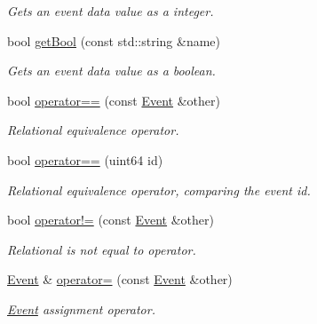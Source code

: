 \begin{DoxyCompactItemize}
\begin{DoxyCompactList}\small\item\em Gets an event data value as a integer. \end{DoxyCompactList}\item 
\mbox{\label{class_arcana_1_1_event_a7f32306719cdc73d3e2a8f4751bc6bb6}} 
bool \mbox{\hyperlink{class_arcana_1_1_event_a7f32306719cdc73d3e2a8f4751bc6bb6}{get\+Bool}} (const std\+::string \&name)
\begin{DoxyCompactList}\small\item\em Gets an event data value as a boolean. \end{DoxyCompactList}\item 
\mbox{\label{class_arcana_1_1_event_ab1238d3e13e2ce43528ab2dff03affb4}} 
bool \mbox{\hyperlink{class_arcana_1_1_event_ab1238d3e13e2ce43528ab2dff03affb4}{operator==}} (const \mbox{\hyperlink{class_arcana_1_1_event}{Event}} \&other)
\begin{DoxyCompactList}\small\item\em Relational equivalence operator. \end{DoxyCompactList}\item 
\mbox{\label{class_arcana_1_1_event_a7ac3cf135728b6c3349f815590093758}} 
bool \mbox{\hyperlink{class_arcana_1_1_event_a7ac3cf135728b6c3349f815590093758}{operator==}} (uint64 id)
\begin{DoxyCompactList}\small\item\em Relational equivalence operator, comparing the event id. \end{DoxyCompactList}\item 
\mbox{\label{class_arcana_1_1_event_a22b10bbc262a405ea92f06efdff9ab37}} 
bool \mbox{\hyperlink{class_arcana_1_1_event_a22b10bbc262a405ea92f06efdff9ab37}{operator!=}} (const \mbox{\hyperlink{class_arcana_1_1_event}{Event}} \&other)
\begin{DoxyCompactList}\small\item\em Relational \textquotesingle{}is not equal to\textquotesingle{} operator. \end{DoxyCompactList}\item 
\mbox{\label{class_arcana_1_1_event_abf8a0f5fdd48d07fe85c47b57bd935ce}} 
\mbox{\hyperlink{class_arcana_1_1_event}{Event}} \& \mbox{\hyperlink{class_arcana_1_1_event_abf8a0f5fdd48d07fe85c47b57bd935ce}{operator=}} (const \mbox{\hyperlink{class_arcana_1_1_event}{Event}} \&other)
\begin{DoxyCompactList}\small\item\em \mbox{\hyperlink{class_arcana_1_1_event}{Event}} assignment operator. \end{DoxyCompactList}\end{DoxyCompactItemize}



